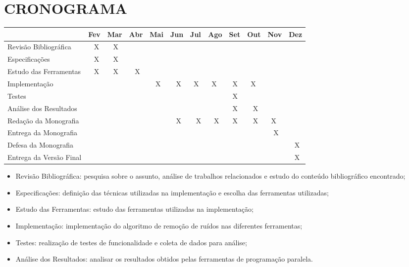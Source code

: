 
\chapter{CRONOGRAMA}
\label{chap:cronograma}

\begin{table}[H]
\centering
\begin{tabular}{|l|l|l|l|l|l|l|l|l|l|l|l|} 
\hline
                        & Fev & Mar & Abr & Mai & Jun & Jul & Ago & Set & Out & Nov & Dez  \\ 
\hline
Revisão Bibliográfica   & ~ X & ~ X & ~~  &     &     &     &     &     &     &     &      \\ 
\hline
Especificações          & ~ X & ~ X & ~~  &     &     &     &     &     &     &     &      \\ 
\hline
Estudo das Ferramentas   & ~ X & ~ X & ~ X &     &     &     &    &     &     &     &      \\ 
\hline
Implementação           &     &     &     & ~ X & ~ X & ~X  & ~X  & ~X  & ~X  &     &      \\ 
\hline
Testes                  &     &     &     &     &     &     &     & ~X  & ~~  &     &      \\ 
\hline
Análise dos Resultados  &     &     &     &     &     &     &     & ~X  & ~ X &     &      \\ 
\hline
Redação da Monografia   &     &     &     &     & ~ X & ~ X & ~ X & ~X  & ~ X & ~X  &      \\ 
\hline
Entrega da Monografia   &     &     &     &     &     &     &     &     &     & ~ X &      \\ 
\hline
Defesa da Monografia    &     &     &     &     &     &     &     &     &     &     & ~ X  \\ 
\hline
Entrega da Versão Final &     &     &     &     &     &     &     &     &     &     & ~ X  \\
\hline
\end{tabular}
\end{table}

\begin{itemize}
    \item Revisão Bibliográfica: pesquisa sobre o assunto, análise de trabalhos relacionados e
estudo do conteúdo bibliográfico encontrado;
    \item Especificações: definição das técnicas utilizadas na implementação e escolha das
ferramentas utilizadas;
    \item Estudo das Ferramentas: estudo das ferramentas utilizadas na implementação;
    \item Implementação: implementação do algoritmo de remoção de ruídos nas diferentes
ferramentas;
    \item Testes: realização de testes de funcionalidade e coleta de dados para análise;
    \item Análise dos Resultados: analisar os resultados obtidos pelas ferramentas de
programação paralela.
\end{itemize}
